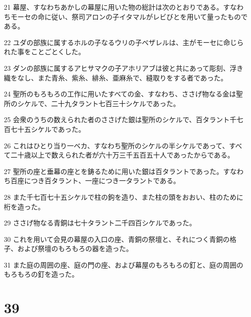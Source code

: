 \par 21 幕屋、すなわちあかしの幕屋に用いた物の総計は次のとおりである。すなわちモーセの命に従い、祭司アロンの子イタマルがレビびとを用いて量ったものである。
\par 22 ユダの部族に属するホルの子なるウリの子ベザレルは、主がモーセに命じられた事をことごとくした。
\par 23 ダンの部族に属するアヒサマクの子アホリアブは彼と共にあって彫刻、浮き織をなし、また青糸、紫糸、緋糸、亜麻糸で、縫取りをする者であった。
\par 24 聖所のもろもろの工作に用いたすべての金、すなわち、ささげ物なる金は聖所のシケルで、二十九タラント七百三十シケルであった。
\par 25 会衆のうちの数えられた者のささげた銀は聖所のシケルで、百タラント千七百七十五シケルであった。
\par 26 これはひとり当り一ベカ、すなわち聖所のシケルの半シケルであって、すべて二十歳以上で数えられた者が六十万三千五百五十人であったからである。
\par 27 聖所の座と垂幕の座とを鋳るために用いた銀は百タラントであった。すなわち百座につき百タラント、一座につき一タラントである。
\par 28 また千七百七十五シケルで柱の鉤を造り、また柱の頭をおおい、柱のために桁を造った。
\par 29 ささげ物なる青銅は七十タラント二千四百シケルであった。
\par 30 これを用いて会見の幕屋の入口の座、青銅の祭壇と、それにつく青銅の格子、および祭壇のもろもろの器を造った。
\par 31 また庭の周囲の座、庭の門の座、および幕屋のもろもろの釘と、庭の周囲のもろもろの釘を造った。

\chapter{39}

